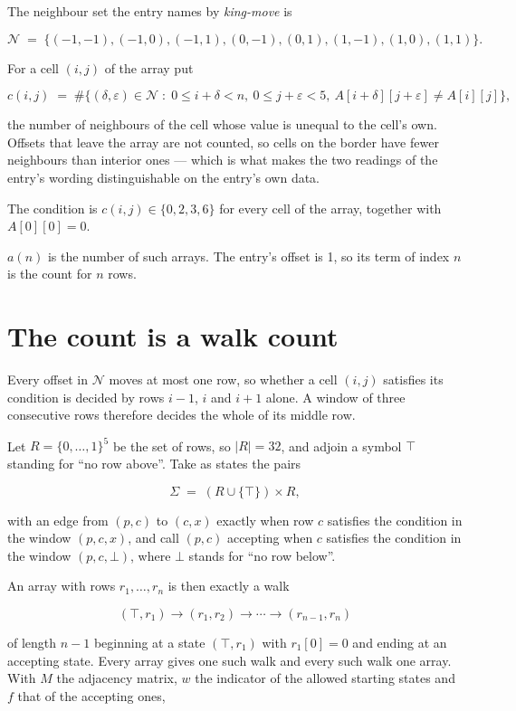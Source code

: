 \documentclass[11pt]{article}
\theoremstyle{definition}
\begin{document}
The neighbour set the entry names by {\itshape king-move} is

\[\mathcal{N} \;=\; \{(-1,-1), (-1,0), (-1,1), (0,-1), (0,1), (1,-1), (1,0), (1,1)\}.\]

For a cell $(i,j)$ of the array put

\[c(i,j) \;=\; \#\bigl\{(\delta,\varepsilon)\in\mathcal{N} \;:\; 0\le i+\delta<n,\ 0\le j+\varepsilon<5,\ A[i+\delta][j+\varepsilon] \neq A[i][j]\bigr\},\]

the number of neighbours of the cell whose value is unequal to the cell's own. Offsets that leave the array are not counted, so cells on the border have fewer neighbours than interior ones --- which is what makes the two readings of the entry's wording distinguishable on the entry's own data.

The condition is $c(i,j) \in \{0, 2, 3, 6\}$ for every cell of the array, together with $A[0][0]=0$.

$a(n)$ is the number of such arrays. The entry's offset is 1, so its term of index $n$ is the count for $n$ rows.

\section{The count is a walk count}

Every offset in $\mathcal{N}$ moves at most one row, so whether a cell $(i,j)$ satisfies its condition is decided by rows $i-1$, $i$ and $i+1$ alone. A window of three consecutive rows therefore decides the whole of its middle row.

Let $R = \{0,\dots,1\}^{5}$ be the set of rows, so $|R| = 32$, and adjoin a symbol $\top$ standing for ``no row above''. Take as states the pairs

\[\Sigma \;=\; (R \cup \{\top\}) \times R,\]

with an edge from $(p,c)$ to $(c,x)$ exactly when row $c$ satisfies the condition in the window $(p,c,x)$, and call $(p,c)$ accepting when $c$ satisfies the condition in the window $(p,c,\bot)$, where $\bot$ stands for ``no row below''.

An array with rows $r_1,\dots,r_n$ is then exactly a walk

\[(\top,r_1) \to (r_1,r_2) \to \cdots \to (r_{n-1},r_n)\]

of length $n-1$ beginning at a state $(\top,r_1)$ with $r_1[0]=0$ and ending at an accepting state. Every array gives one such walk and every such walk one array. With $M$ the adjacency matrix, $w$ the indicator of the allowed starting states and $f$ that of the accepting ones,
\end{document}

